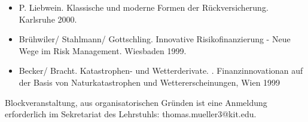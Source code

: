 \begin{course}
\begin{content}
\end{content}



\begin{literature}\begin{itemize}\item P. Liebwein. Klassische und moderne Formen der Rückversicherung. Karlsruhe 2000.  \item Brühwiler/ Stahlmann/ Gottschling. Innovative Risikofinanzierung - Neue Wege im Risk Management. Wiesbaden 1999.  \item Becker/ Bracht. Katastrophen- und Wetterderivate. . Finanzinnovationan auf der Basis von Naturkatastrophen und Wettererscheinungen, Wien 1999  \end{itemize}\end{literature}

\begin{remarks}Blockveranstaltung, aus organisatorischen Gründen ist eine Anmeldung erforderlich im Sekretariat des Lehrstuhls: thomas.mueller3@kit.edu.

\end{remarks}

\end{course}